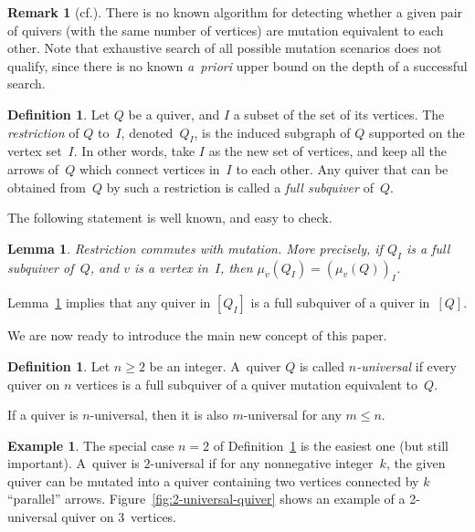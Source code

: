 \documentclass[10pt]{amsart}
\newtheorem{lemma}[theorem]{Lemma}
\theoremstyle{definition}
\newtheorem{definition}[theorem]{Definition}
\newtheorem{remark}[theorem]{Remark}
\newtheorem{example}[theorem]{Example}
\newcommand{\cf}{cf.}
\begin{document}
\begin{remark}[{\cf \cite[Problem~2.6.14]{FWZ}}]
There is no known algorithm for detecting whether a given pair of quivers (with the same number of vertices) are mutation equivalent to each other. Note that exhaustive search of all possible mutation scenarios does not qualify, since there is no known \emph{a~priori} upper bound on the depth of a successful search. 
\end{remark}

\begin{definition}
\label{def:full-subquiver}
Let $Q$ be a quiver, and $I$ a subset of the set of its vertices. The \emph{restriction} of $Q$ to~$I$, denoted~$Q_I$, is the induced subgraph of $Q$ supported on the vertex set~$I$. In other words, take $I$ as the new set of vertices, and keep all the arrows of~$Q$ which connect vertices in~$I$ to each other. Any quiver that can be obtained from~$Q$ by such a restriction is called a \emph{full subquiver} of~$Q$. 
\end{definition}


The following statement is well known, and easy to check.

\begin{lemma}
\label{lem:restriction-mutation}
Restriction commutes with mutation. More precisely, if $Q_I$ is a full sub\-quiver of~$Q$, and $v$ is a vertex in~$I$, then $\mu_v(Q_I)=(\mu_v(Q))_I$. 
\end{lemma}

Lemma~\ref{lem:restriction-mutation} implies that any quiver in 
$[Q_I]$ is a full subquiver of a quiver in~$[Q]$. 


We are now ready to introduce the main new concept of this paper. 

\begin{definition}
\label{def:n-universal}
Let $n\ge 2$ be an integer. 
A~quiver $Q$ is called \emph{$n$-universal} 
if every quiver on $n$ vertices is a full subquiver of a quiver mutation equivalent to~$Q$. 
\end{definition}

If a quiver is $n$-universal, then it is also $m$-universal for any $m\le n$. 

\begin{example}
The special case $n=2$ of Definition~\ref{def:n-universal} is the easiest one (but still important). A~quiver is $2$-universal if for any nonnegative integer~$k$, the given quiver can be mutated into a quiver containing two vertices connected by $k$ ``parallel'' arrows. 
%
Figure~\ref{fig:2-universal-quiver} shows an example of a 2-universal quiver on $3$~vertices. 
\end{example}
\end{document}
